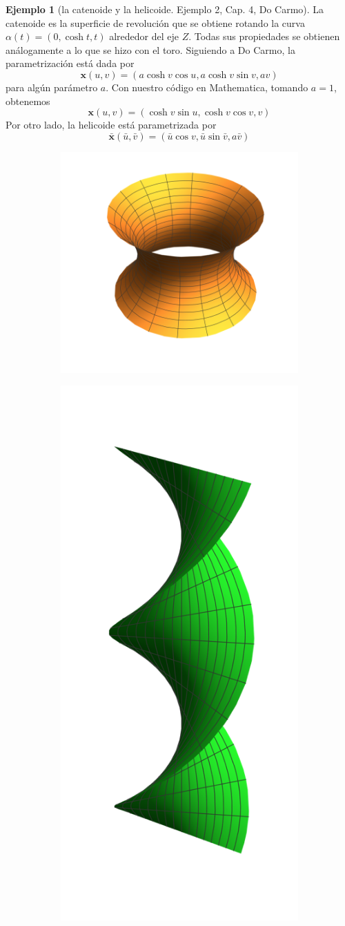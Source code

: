\documentclass[spanish]{book}
\theoremstyle{definition}
\newtheorem*{ejem}{Ejemplo}
\begin{document}
\begin{ejem}[la catenoide y la helicoide. Ejemplo 2, Cap. 4, Do Carmo]
	La catenoide es la superficie de revolución que se obtiene rotando la curva $\alpha(t)=(0,\cosh{t},t)$ alrededor del eje $Z$. Todas sus propiedades se obtienen análogamente a lo que se hizo con el toro. Siguiendo a Do Carmo, la parametrización está dada por
	\[\mathbf{x}(u,v)= (a\cosh{v}\cos{u},a\cosh{v}\sin{v},av)\]
	para algún parámetro $a$. Con nuestro código en Mathematica, tomando $a=1$, obtenemos
	\[\mathbf{x}(u,v)= (\cosh{v}\sin{u},\cosh{v}\cos{v},v)\]
	Por otro lado, la helicoide está parametrizada por
	\[\bar{\mathbf{x}}(\bar{u},\bar{v})= (\bar{u}\cos{v},\bar{u}\sin{\bar{v}},a\bar{v})\]
	\begin{figure}[H]
		\begin{subfigure}{0.5\textwidth}
			\centering
			\includegraphics[width=0.9\linewidth]{sup8}
		\end{subfigure}
		\begin{subfigure}{0.5\textwidth}
			\centering
			\includegraphics[width=0.4\linewidth]{sup9}
		\end{subfigure}
	\end{figure}
\end{ejem}
\end{document}
